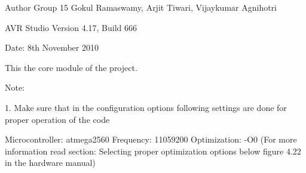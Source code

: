 \begin{DoxyAuthor}{Author}
Group 15 Gokul Ramaswamy, Arjit Tiwari, Vijaykumar Agnihotri
\end{DoxyAuthor}
AVR Studio Version 4.17, Build 666

Date: 8th November 2010

This the core module of the project.

Note:

1. Make sure that in the configuration options following settings are done for proper operation of the code

Microcontroller: atmega2560 Frequency: 11059200 Optimization: -\/O0 (For more information read section: Selecting proper optimization options below figure 4.22 in the hardware manual) 